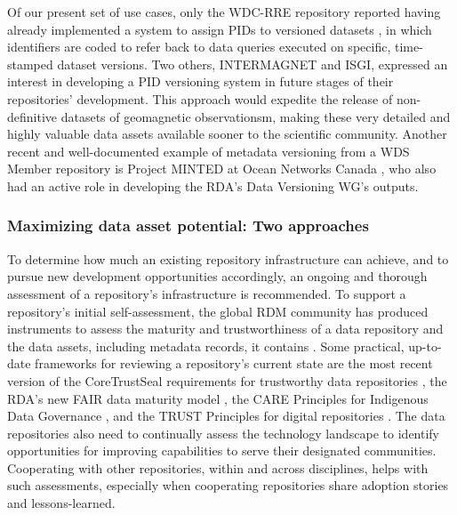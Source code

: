 \documentclass{interact}
\begin{document}
Of our present set of use cases, only the WDC-RRE repository reported having already implemented a system to assign PIDs to versioned datasets \parencite{institute_of_geographic_2016}, in which identifiers are coded to refer back to data queries executed on specific, time-stamped dataset versions. Two others, INTERMAGNET and ISGI, expressed an interest in developing a PID versioning system in future stages of their repositories' development. This approach would expedite the release of non-definitive datasets of geomagnetic observationsm, making these very detailed and highly valuable data assets available sooner to the scientific community. Another recent and well-documented example of metadata versioning from a WDS Member repository is Project MINTED at Ocean Networks Canada \parencite{jenkyns_minted_2020, jenkyns_making_2019}, who also had an active role in developing the RDA's Data Versioning WG's outputs.

\subsubsection{Maximizing data asset potential: Two approaches}
To determine how much an existing repository infrastructure can achieve, and to pursue new development opportunities accordingly, an ongoing and thorough assessment of a repository’s infrastructure is recommended. To support a repository's initial self-assessment, the global RDM community has produced instruments to assess the maturity and trustworthiness of a data repository and the data assets, including metadata records, it contains \parencite{downs_improving_2021, peng_state_2018}. Some practical, up-to-date frameworks for reviewing a repository’s current state are the most recent version of the CoreTrustSeal requirements for trustworthy data repositories \parencite{coretrustseal_coretrustseal_2019}, the RDA’s new FAIR data maturity model \parencite{fair_data_maturity_model_wg_fair_2020}, the CARE Principles for Indigenous Data Governance \parencite{carroll_care_2020}, and the TRUST Principles for digital repositories \parencite{lin_trust_2020}. The data repositories also need to continually assess the technology landscape to identify opportunities for improving capabilities to serve their designated communities. Cooperating with other repositories, within and across disciplines, helps with such assessments, especially when cooperating repositories share adoption stories and lessons-learned.
\end{document}

